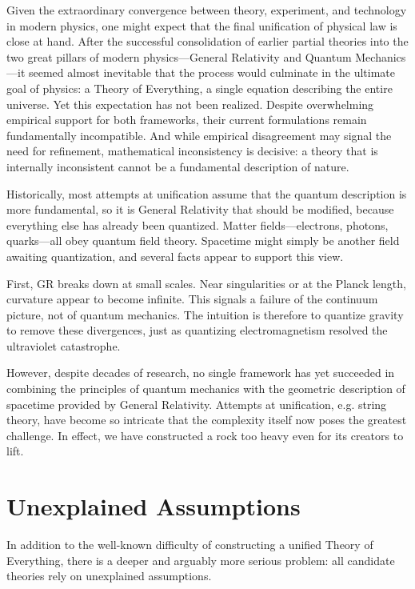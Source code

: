 Given the extraordinary convergence between theory, experiment, and technology in modern physics, one might expect that the final unification of physical law is close at hand. 
After the successful consolidation of earlier partial theories into the two great pillars of modern physics—General Relativity and Quantum Mechanics—it 
seemed almost inevitable that the process would culminate in the ultimate goal of physics: a Theory of Everything, a single equation describing the entire universe. 
Yet this expectation has not been realized. Despite overwhelming empirical support for both frameworks, their current formulations remain fundamentally incompatible. 
And while empirical disagreement may signal the need for refinement, mathematical inconsistency is decisive: a theory that is internally inconsistent cannot be a fundamental description of nature.

Historically, most attempts at unification assume that the quantum description is more fundamental, so it is General Relativity that should be modified, because everything else has already been quantized. 
Matter fields—electrons, photons, quarks—all obey quantum field theory. Spacetime might simply be another field awaiting quantization, and several facts appear to support this view.

First, GR breaks down at small scales. Near singularities or at the Planck length, curvature appear to become infinite. This signals a failure of the continuum picture, not of quantum mechanics. 
The intuition is therefore to quantize gravity to remove these divergences, just as quantizing electromagnetism resolved the ultraviolet catastrophe.

However, despite decades of research, no single framework has yet succeeded in combining the principles of quantum mechanics with the geometric description of spacetime provided by General Relativity. 
Attempts at unification, e.g. string theory, have become so intricate that the complexity itself now poses the greatest challenge. In effect, we have constructed a rock too heavy even for its creators to lift.



\section{Unexplained Assumptions}

In addition to the well-known difficulty of constructing a unified Theory of Everything, there is a deeper and arguably more serious problem: all candidate theories rely on unexplained assumptions.

